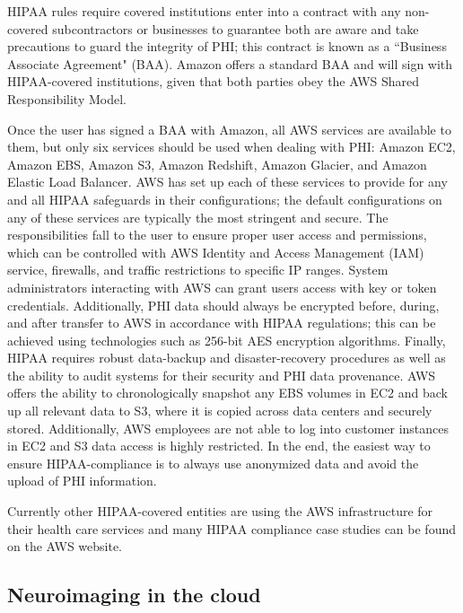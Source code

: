 \documentclass{frontiersSCNS} %
\begin{document}
HIPAA rules require covered institutions enter into a contract with any non-covered subcontractors or businesses to guarantee both are aware and take precautions to guard the integrity of PHI; this contract is known as a ``Business Associate Agreement" (BAA). Amazon offers a standard BAA and will sign with HIPAA-covered institutions, given that both parties obey the AWS Shared Responsibility Model.


Once the user has signed a BAA with Amazon, all AWS services are available to them, but only six services should be used when dealing with PHI: Amazon EC2, Amazon EBS, Amazon S3, Amazon Redshift, Amazon Glacier, and Amazon Elastic Load Balancer. AWS has set up each of these services to provide for any and all HIPAA safeguards in their configurations; the default configurations on any of these services are typically the most stringent and secure. The responsibilities fall to the user to ensure proper user access and permissions, which can be controlled with AWS Identity and Access Management (IAM) service, firewalls, and traffic restrictions to specific IP ranges. System administrators interacting with AWS can grant users access with key or token credentials. Additionally, PHI data should always be encrypted before, during, and after transfer to AWS in accordance with HIPAA regulations; this can be achieved using technologies such as 256-bit AES encryption algorithms. Finally, HIPAA requires robust data-backup and disaster-recovery procedures as well as the ability to audit systems for their security and PHI data provenance. AWS offers the ability to chronologically snapshot any EBS volumes in EC2 and back up all relevant data to S3, where it is copied across data centers and securely stored. Additionally, AWS employees are not able to log into customer instances in EC2 and S3 data access is highly restricted. In the end, the easiest way to ensure HIPAA-compliance is to always use anonymized data and avoid the upload of PHI information.


Currently other HIPAA-covered entities are using the AWS infrastructure for their health care services and many HIPAA compliance case studies can be found on the AWS website.

\subsection{Neuroimaging in the cloud}

\end{document}
